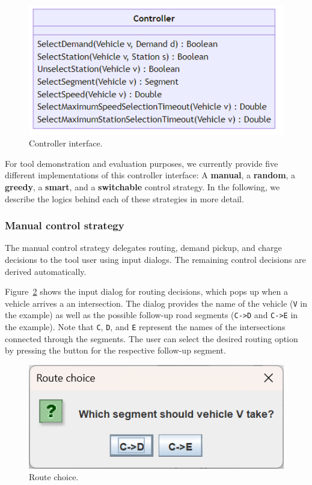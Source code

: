\documentclass[10pt,twocolumn]{article}
\begin{document}
\begin{figure}[!ht]
    \centering
    \includegraphics[scale=0.4]{../../diagrams/controller/classes-minimal.png}
    \caption{Controller interface.}
    \label{fig:controller-interface}
\end{figure}

For tool demonstration and evaluation purposes, we currently provide five different implementations of this controller interface: A \textbf{manual}, a \textbf{random}, a \textbf{greedy}, a \textbf{smart}, and a \textbf{switchable} control strategy.
In the following, we describe the logics behind each of these strategies in more detail.

\subsubsection*{Manual control strategy}
\label{sec:controller-manual}

The manual control strategy delegates routing, demand pickup, and charge decisions to the tool user using input dialogs.
The remaining control decisions are derived automatically.

Figure~\ref{fig:manual-controller-route} shows the input dialog for routing decisions, which pops up when a vehicle arrives a an intersection.
The dialog provides the name of the vehicle (\texttt{V} in the example) as well as the possible follow-up road segments (\texttt{C->D} and \texttt{C->E} in the example).
Note that \texttt{C}, \texttt{D}, and \texttt{E} represent the names of the intersections connected through the segments.
The user can select the desired routing option by pressing the button for the respective follow-up segment.

\begin{figure}[!ht]
    \centering
    \includegraphics[scale=0.4]{../../screenshots/manual-controller-route.png}
    \caption{Route choice.}
    \label{fig:manual-controller-route}
\end{figure}
\end{document}
